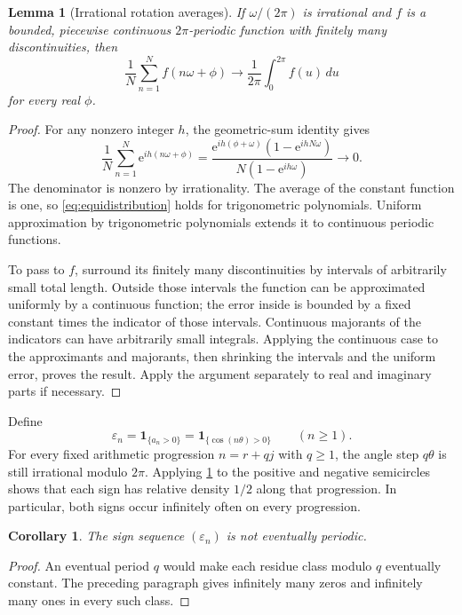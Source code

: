 \documentclass[11pt]{article}
\newtheorem{lemma}[theorem]{Lemma}
\newtheorem{corollary}[theorem]{Corollary}
\theoremstyle{definition}\newtheorem{definition}[theorem]{Definition}
\theoremstyle{remark}\newtheorem{remark}[theorem]{Remark}
\newcommand{\eps}{\varepsilon}
\newcommand{\ind}{\mathbf 1}
\newcommand{\ee}{\mathrm e}
\begin{document}
\begin{lemma}[Irrational rotation averages]\label{lem:rotation}
If $\omega/(2\pi)$ is irrational and $f$ is a bounded, piecewise continuous $2\pi$-periodic function with finitely many discontinuities, then
\begin{equation}\label{eq:equidistribution}
 \frac1N\sum_{n=1}^N f(n\omega+\phi)
 \longrightarrow\frac1{2\pi}\int_0^{2\pi}f(u)\,du
\end{equation}
for every real $\phi$.
\end{lemma}
\begin{proof}
For any nonzero integer $h$, the geometric-sum identity gives
\[
 \frac1N\sum_{n=1}^N\ee^{ih(n\omega+\phi)}
 =\frac{\ee^{ih(\phi+\omega)}(1-\ee^{ihN\omega})}
 {N(1-\ee^{ih\omega})}\longrightarrow0.
\]
The denominator is nonzero by irrationality. The average of the constant function is one, so \eqref{eq:equidistribution} holds for trigonometric polynomials. Uniform approximation by trigonometric polynomials extends it to continuous periodic functions.

To pass to $f$, surround its finitely many discontinuities by intervals of arbitrarily small total length. Outside those intervals the function can be approximated uniformly by a continuous function; the error inside is bounded by a fixed constant times the indicator of those intervals. Continuous majorants of the indicators can have arbitrarily small integrals. Applying the continuous case to the approximants and majorants, then shrinking the intervals and the uniform error, proves the result. Apply the argument separately to real and imaginary parts if necessary.
\end{proof}

Define
\begin{equation}\label{eq:epsilon}
 \eps_n=\ind_{\{a_n>0\}}=\ind_{\{\cos(n\theta)>0\}}\qquad(n\geq1).
\end{equation}
For every fixed arithmetic progression $n=r+qj$ with $q\geq1$, the angle step $q\theta$ is still irrational modulo $2\pi$. Applying \cref{lem:rotation} to the positive and negative semicircles shows that each sign has relative density $1/2$ along that progression. In particular, both signs occur infinitely often on every progression.

\begin{corollary}\label{cor:nonperiodic}
The sign sequence $(\eps_n)$ is not eventually periodic.
\end{corollary}
\begin{proof}
An eventual period $q$ would make each residue class modulo $q$ eventually constant. The preceding paragraph gives infinitely many zeros and infinitely many ones in every such class.
\end{proof}
\end{document}
